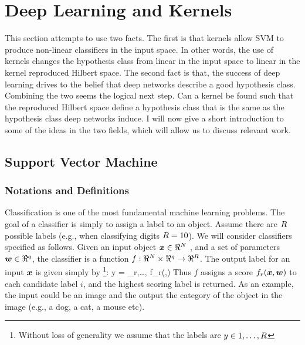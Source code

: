 \section{Deep Learning and Kernels}
This section attempts to use two facts.
The first is that kernels allow SVM to produce non-linear classifiers in the input space.
In other words, the use of kernels changes the hypothesis class from linear in the input space to linear in the kernel reproduced Hilbert space.
The second fact is that, the success of deep learning drives to the belief that deep networks describe a good hypothesis class.
Combining the two seems the logical next step.
Can a kernel be found such that the reproduced Hilbert space define a hypothesis class that is the same as the hypothesis class deep networks induce.
I will now give a short introduction to some of the ideas in the two fields, which will allow us to discuss relevant work.
\subsection{Support Vector Machine}
\subsubsection{Notations and Definitions}
Classification is one of the most fundamental machine learning problems. The goal of a classifier is simply to assign a label to an object. Assume there are $R$ possible labels (e.g., when classifying digits $R=10$). We will consider classifiers specified as follows. Given an input object $\boldsymbol{x} \in \Re^N$ , and a set of parameters $\boldsymbol{w}\in\Re^q$, the classifier is a function $f: \Re^N \times \Re^q \to \Re^R$. The output label for an input $\boldsymbol{x}$ is given simply by
\footnote{Without loss of generality we assume that the labels are $y \in 1,\ldots,R$}:
\be
y = \arg\max_{r,\ldots, \card} f_r(\xx,\ww)
\label{eq:argmax_classify}
\ee
Thus $f$ assigns a score $f_r(\boldsymbol{x},\boldsymbol{w})$ to each candidate label $i$, and the highest scoring label is returned.
As an example, the input could be an image and the output the category of the object in the image (e.g., a dog, a cat, a mouse etc). 


